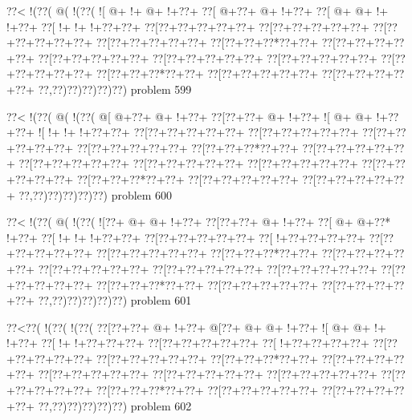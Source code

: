 \vbox{\vbox{\goo
\0??<\- !(\0??(\- @(\- !(\0??(
\- ![\- @+\- !+\- @+\- !+\0??+
\0??[\- @+\0??+\- @+\- !+\0??+
\0??[\- @+\- @+\- !+\- !+\0??+
\0??[\- !+\- !+\- !+\0??+\0??+
\0??[\0??+\0??+\0??+\0??+\0??+
\0??[\0??+\0??+\0??+\0??+\0??+
\0??[\0??+\0??+\0??+\0??+\0??+
\0??[\0??+\0??+\0??+\0??+\0??+
\0??[\0??+\0??+\0??*\0??+\0??+
\0??[\0??+\0??+\0??+\0??+\0??+
\0??[\0??+\0??+\0??+\0??+\0??+
\0??[\0??+\0??+\0??+\0??+\0??+
\0??[\0??+\0??+\0??+\0??+\0??+
\0??[\0??+\0??+\0??+\0??+\0??+
\0??[\0??+\0??+\0??*\0??+\0??+
\0??[\0??+\0??+\0??+\0??+\0??+
\0??[\0??+\0??+\0??+\0??+\0??+
\0??,\0??)\0??)\0??)\0??)\0??)
}
\hfil problem 599\hfil\break
}

\vbox{\vbox{\goo
\0??<\- !(\0??(\- @(\- !(\0??(
\- @[\- @+\0??+\- @+\- !+\0??+
\0??[\0??+\0??+\- @+\- !+\0??+
\- ![\- @+\- @+\- !+\0??+\0??+
\- ![\- !+\- !+\- !+\0??+\0??+
\0??[\0??+\0??+\0??+\0??+\0??+
\0??[\0??+\0??+\0??+\0??+\0??+
\0??[\0??+\0??+\0??+\0??+\0??+
\0??[\0??+\0??+\0??+\0??+\0??+
\0??[\0??+\0??+\0??*\0??+\0??+
\0??[\0??+\0??+\0??+\0??+\0??+
\0??[\0??+\0??+\0??+\0??+\0??+
\0??[\0??+\0??+\0??+\0??+\0??+
\0??[\0??+\0??+\0??+\0??+\0??+
\0??[\0??+\0??+\0??+\0??+\0??+
\0??[\0??+\0??+\0??*\0??+\0??+
\0??[\0??+\0??+\0??+\0??+\0??+
\0??[\0??+\0??+\0??+\0??+\0??+
\0??,\0??)\0??)\0??)\0??)\0??)
}
\hfil problem 600\hfil\break
}

\vbox{\vbox{\goo
\0??<\- !(\0??(\- @(\- !(\0??(
\- ![\0??+\- @+\- @+\- !+\0??+
\0??[\0??+\0??+\- @+\- !+\0??+
\0??[\- @+\- @+\0??*\- !+\0??+
\0??[\- !+\- !+\- !+\0??+\0??+
\0??[\0??+\0??+\0??+\0??+\0??+
\0??[\- !+\0??+\0??+\0??+\0??+
\0??[\0??+\0??+\0??+\0??+\0??+
\0??[\0??+\0??+\0??+\0??+\0??+
\0??[\0??+\0??+\0??*\0??+\0??+
\0??[\0??+\0??+\0??+\0??+\0??+
\0??[\0??+\0??+\0??+\0??+\0??+
\0??[\0??+\0??+\0??+\0??+\0??+
\0??[\0??+\0??+\0??+\0??+\0??+
\0??[\0??+\0??+\0??+\0??+\0??+
\0??[\0??+\0??+\0??*\0??+\0??+
\0??[\0??+\0??+\0??+\0??+\0??+
\0??[\0??+\0??+\0??+\0??+\0??+
\0??,\0??)\0??)\0??)\0??)\0??)
}
\hfil problem 601\hfil\break
}

\vbox{\vbox{\goo
\0??<\0??(\- !(\0??(\- !(\0??(
\0??[\0??+\0??+\- @+\- !+\0??+
\- @[\0??+\- @+\- @+\- !+\0??+
\- ![\- @+\- @+\- !+\- !+\0??+
\0??[\- !+\- !+\0??+\0??+\0??+
\0??[\0??+\0??+\0??+\0??+\0??+
\0??[\- !+\0??+\0??+\0??+\0??+
\0??[\0??+\0??+\0??+\0??+\0??+
\0??[\0??+\0??+\0??+\0??+\0??+
\0??[\0??+\0??+\0??*\0??+\0??+
\0??[\0??+\0??+\0??+\0??+\0??+
\0??[\0??+\0??+\0??+\0??+\0??+
\0??[\0??+\0??+\0??+\0??+\0??+
\0??[\0??+\0??+\0??+\0??+\0??+
\0??[\0??+\0??+\0??+\0??+\0??+
\0??[\0??+\0??+\0??*\0??+\0??+
\0??[\0??+\0??+\0??+\0??+\0??+
\0??[\0??+\0??+\0??+\0??+\0??+
\0??,\0??)\0??)\0??)\0??)\0??)
}
\hfil problem 602\hfil\break
}

